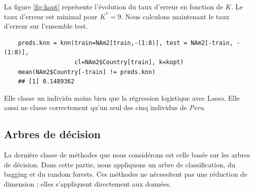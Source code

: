 \documentclass[12pt,a4paper]{article}
\begin{document}
La figure \ref{fig:kopt} représente l'évolution du taux d'erreur en fonction de $K$. Le taux d'erreur est minimal pour $K^* = 9$. Nous calculons maintenant le taux d'erreur sur l'ensemble test.\vspace{2mm}
\begin{lstlisting}
	preds.knn = knn(train=NAm2[train,-(1:8)], test = NAm2[-train, -(1:8)],
	                cl=NAm2$Country[train], k=kopt)
	mean(NAm2$Country[-train] != preds.knn)
	## [1] 0.1489362
\end{lstlisting}
Elle classe un individu moins bien que la régression logistique avec Lasso. Elle aussi ne classe correctement qu'un seul des cinq individus de \textit{Peru}.
\subsection{Arbres de décision}
La dernière classe de méthodes que nous considérons est celle basée sur les arbres de décision. Dans cette partie, nous appliquons un arbre de classification, du bagging et du random forests. Ces méthodes ne nécessitent pas une réduction de dimension ; elles s'appliquent directement aux données.
\end{document}
